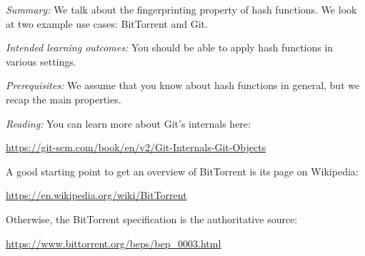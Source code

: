 
\emph{Summary:}
We talk about the fingerprinting property of hash functions.
We look at two example use cases: BitTorrent and Git.

\emph{Intended learning outcomes:}
You should be able to apply hash functions in various settings.

\emph{Prerequisites:}
We assume that you know about hash functions in general, but we recap the main 
properties.

\emph{Reading:}
You can learn more about Git's internals here:
\begin{center}
  \url{https://git-scm.com/book/en/v2/Git-Internals-Git-Objects}
\end{center}
A good starting point to get an overview of BitTorrent is its page on 
Wikipedia:
\begin{center}
  \url{https://en.wikipedia.org/wiki/BitTorrent}
\end{center}
Otherwise, the BitTorrent specification is the authoritative source:
\begin{center}
  \url{https://www.bittorrent.org/beps/bep_0003.html}
\end{center}
